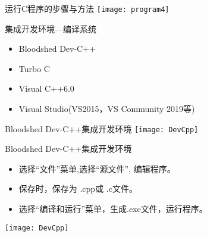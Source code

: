 \begin{frame}{运行C程序的步骤与方法}
\texttt{[image: program4]}
\end{frame}

\begin{frame}{集成开发环境---编译系统}
\begin{itemize}
	\item Bloodshed Dev-C++ 
	\item Turbo C
	\item Visual C++6.0 
	\item Visual Studio(VS2015，VS Community 2019等)
\end{itemize}
\end{frame}

\begin{frame}{Bloodshed Dev-C++集成开发环境}
\texttt{[image: DevCpp]}   
\end{frame}

\begin{frame}{Bloodshed Dev-C++集成开发环境}
\begin{itemize}
	\item 选择“文件”菜单,选择“源文件”, 编辑程序。
	\item 保存时，保存为 .cpp或 .c文件。
	\item 选择“编译和运行”菜单，生成.exe文件，运行程序。  
\end{itemize} 
\texttt{[image: DevCpp]}   
\end{frame}